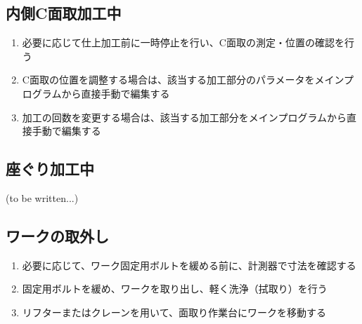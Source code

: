 \subsection{内側C面取加工中}
\begin{enumerate}
\item 必要に応じて仕上加工前に一時停止を行い、C面取の測定・位置の確認を行う
\item C面取の位置を調整する場合は、該当する加工部分のパラメータをメインプログラムから直接手動で編集する
\item 加工の回数を変更する場合は、該当する加工部分をメインプログラムから直接手動で編集する
\end{enumerate}


\clearpage
\subsection{座ぐり加工中\TBW}
(to be written...)



\clearpage


\subsection{ワークの取外し}
\begin{enumerate}
\item 必要に応じて、ワーク固定用ボルトを緩める前に、計測器で寸法を確認する
\item 固定用ボルトを緩め、ワークを取り出し、軽く洗浄（拭取り）を行う
\item {}リフターまたはクレーンを用いて、面取り作業台にワークを移動する
\end{enumerate}


